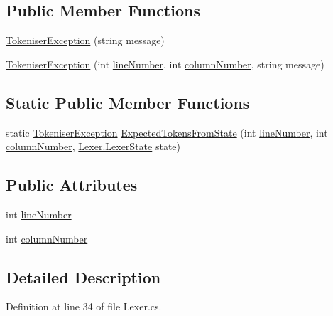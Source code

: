 \subsection*{Public Member Functions}
\begin{DoxyCompactItemize}
\item 
\hyperlink{a00176_ad00fcf742d2b0d476ce43b27a3f3b6c1}{Tokeniser\-Exception} (string message)
\item 
\hyperlink{a00176_aa8674d006a0d29081a7b87bdd8ff2f4f}{Tokeniser\-Exception} (int \hyperlink{a00176_a54b936d7b4f26f88a07a66c5fc1d1ad1}{line\-Number}, int \hyperlink{a00176_aabf2ad38f3984297c1daede9be55e3d6}{column\-Number}, string message)
\end{DoxyCompactItemize}
\subsection*{Static Public Member Functions}
\begin{DoxyCompactItemize}
\item 
static \hyperlink{a00176}{Tokeniser\-Exception} \hyperlink{a00176_af88cfa5eafdee355e1abb67e358497bd}{Expected\-Tokens\-From\-State} (int \hyperlink{a00176_a54b936d7b4f26f88a07a66c5fc1d1ad1}{line\-Number}, int \hyperlink{a00176_aabf2ad38f3984297c1daede9be55e3d6}{column\-Number}, \hyperlink{a00130}{Lexer.\-Lexer\-State} state)
\end{DoxyCompactItemize}
\subsection*{Public Attributes}
\begin{DoxyCompactItemize}
\item 
int \hyperlink{a00176_a54b936d7b4f26f88a07a66c5fc1d1ad1}{line\-Number}
\item 
int \hyperlink{a00176_aabf2ad38f3984297c1daede9be55e3d6}{column\-Number}
\end{DoxyCompactItemize}


\subsection{Detailed Description}


Definition at line 34 of file Lexer.\-cs.



